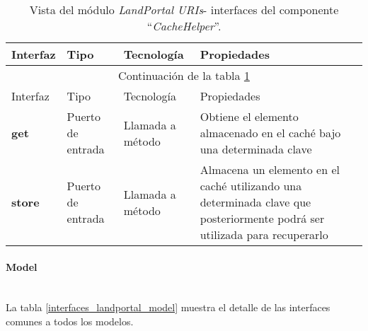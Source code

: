 \begin{longtable}[c]{|p{25mm}|p{20mm}|p{30mm}|p{60mm}|}
	\caption{Vista del módulo \textit{LandPortal URIs}- interfaces del componente ``\textit{CacheHelper}''. \label{interfaces_landportal_uris_cachehelper}}\\
		\hline
			Interfaz & Tipo & Tecnología & Propiedades\\
		\hline
		\hline
	\endfirsthead
		\hline
		\multicolumn{4}{|c|}{Continuación de la tabla \ref{interfaces_landportal_uris_cachehelper}}\\
		\hline
			Interfaz & Tipo & Tecnología & Propiedades\\
		\hline
		\hline
	\endhead
	\hline
	\endfoot
		\textbf{get} & Puerto de entrada & Llamada a método & Obtiene el elemento almacenado en el caché bajo una determinada clave \\
		\hline
		\textbf{store} & Puerto de entrada & Llamada a método & Almacena un elemento en el caché utilizando una determinada clave que posteriormente podrá ser utilizada para recuperarlo \\
		\hline
	\hline
	\hline
\end{longtable}

\paragraph{Model} \hfill \\
La tabla \ref{interfaces_landportal_model} muestra el detalle de las interfaces comunes a todos los modelos.  

